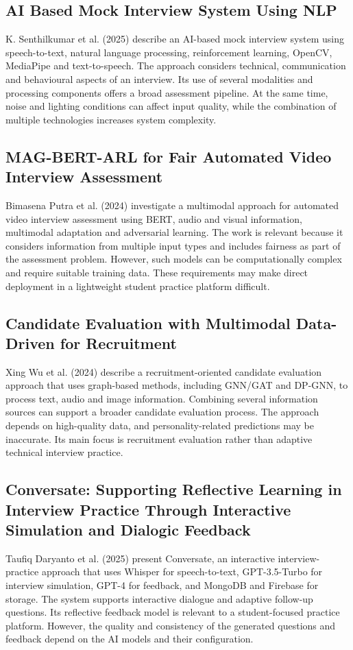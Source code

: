 \documentclass[12pt,a4paper,oneside]{report}
\begin{document}
\subsection{AI Based Mock Interview System Using NLP}
K. Senthilkumar et al. (2025) describe an AI-based mock interview system using speech-to-text, natural language processing, reinforcement learning, OpenCV, MediaPipe and text-to-speech. The approach considers technical, communication and behavioural aspects of an interview. Its use of several modalities and processing components offers a broad assessment pipeline. At the same time, noise and lighting conditions can affect input quality, while the combination of multiple technologies increases system complexity.

\subsection{MAG-BERT-ARL for Fair Automated Video Interview Assessment}
Bimasena Putra et al. (2024) investigate a multimodal approach for automated video interview assessment using BERT, audio and visual information, multimodal adaptation and adversarial learning. The work is relevant because it considers information from multiple input types and includes fairness as part of the assessment problem. However, such models can be computationally complex and require suitable training data. These requirements may make direct deployment in a lightweight student practice platform difficult.

\subsection{Candidate Evaluation with Multimodal Data-Driven for Recruitment}
Xing Wu et al. (2024) describe a recruitment-oriented candidate evaluation approach that uses graph-based methods, including GNN/GAT and DP-GNN, to process text, audio and image information. Combining several information sources can support a broader candidate evaluation process. The approach depends on high-quality data, and personality-related predictions may be inaccurate. Its main focus is recruitment evaluation rather than adaptive technical interview practice.

\subsection{Conversate: Supporting Reflective Learning in Interview Practice Through Interactive Simulation and Dialogic Feedback}
Taufiq Daryanto et al. (2025) present Conversate, an interactive interview-practice approach that uses Whisper for speech-to-text, GPT-3.5-Turbo for interview simulation, GPT-4 for feedback, and MongoDB and Firebase for storage. The system supports interactive dialogue and adaptive follow-up questions. Its reflective feedback model is relevant to a student-focused practice platform. However, the quality and consistency of the generated questions and feedback depend on the AI models and their configuration.
\end{document}
